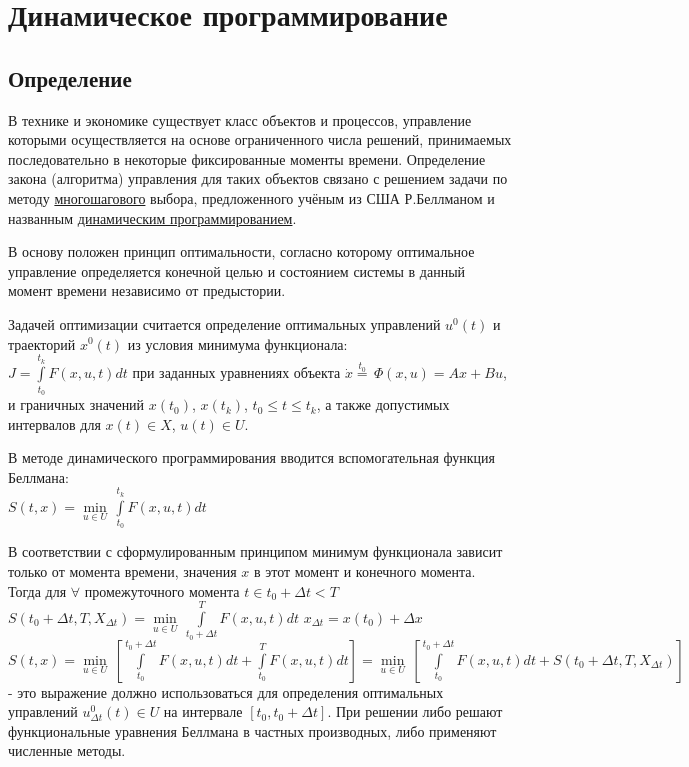\documentclass[preprint,russian,a5paper,10pt,twoside,mediummath]{ncc}
\begin{document}
\clearpage   
\section{Динамическое программирование\label{dyn_prog}}
	\subsection{Определение\label{dyn_prog:def}}
  \par В технике и экономике существует класс объектов и процессов, управление которыми осуществляется на основе ограниченного числа решений, принимаемых последовательно в некоторые фиксированные моменты времени. Определение закона (алгоритма) управления для таких объектов связано с решением задачи по методу \underline{многошагового} выбора, предложенного учёным из США Р.Беллманом и названным \underline{динамическим программированием}.
  \par В основу положен принцип оптимальности, согласно которому оптимальное управление определяется конечной целью и состоянием системы в данный момент времени независимо от предыстории.
  \par Задачей оптимизации считается определение оптимальных управлений ${{u}^{0}}\left( t \right)$ и траекторий ${{x}^{0}}\left( t \right)$ из условия минимума функционала:
\\$J=\int\limits_{{{t}_{0}}}^{{{t}_{k}}}{F\left( x,u,t \right)dt}$ при заданных уравнениях объекта $\dot{x}\overset{{{t}_{0}}}{\mathop{=}}\,\Phi \left( x,u \right)=Ax+Bu$, и граничных значений $x\left( {{t}_{0}} \right)$, $x\left( {{t}_{k}} \right)$, ${{t}_{0}}\le t\le {{t}_{k}}$, а также допустимых интервалов для $x\left( t \right)\in X$, $u\left( t \right)\in U$.
\par В методе динамического программирования вводится вспомогательная функция Беллмана:
\\$S\left( t,x \right)=\underset{u\in U}{\mathop{\min }}\,\int\limits_{{{t}_{0}}}^{{{t}_{k}}}{F\left( x,u,t \right)dt}$ 
\par В соответствии с сформулированным принципом минимум функционала зависит только от момента времени, значения $x$ в этот момент и конечного момента. Тогда для $\forall $ промежуточного момента $t\in {{t}_{0}}+\Delta t<T$ $S\left( {{t}_{0}}+\Delta t,T,{{X}_{\Delta t}} \right)=\underset{u\in U}{\mathop{\min }}\,\int\limits_{{{t}_{0}}+\Delta t}^{T}{F\left( x,u,t \right)dt}$ ${{x}_{\Delta t}}=x\left( {{t}_{0}} \right)+\Delta x$ $S\left( t,x \right)=\underset{u\in U}{\mathop{\min }}\,\left[ \int\limits_{{{t}_{0}}}^{{{t}_{0}}+\Delta t}{F\left( x,u,t \right)dt+\int\limits_{{{t}_{0}}}^{T}{F\left( x,u,t \right)dt}} \right]=\underset{u\in U}{\mathop{\min }}\,\left[ \int\limits_{{{t}_{0}}}^{{{t}_{0}}+\Delta t}{F\left( x,u,t \right)dt+S\left( {{t}_{0}}+\Delta t,T,{{X}_{\Delta t}} \right)} \right]$ - это выражение должно использоваться для определения оптимальных управлений $u_{\Delta t}^{0}\left( t \right)\in U$ на интервале $\left[ {{t}_{0}},{{t}_{0}}+\Delta t \right]$. При решении либо решают функциональные уравнения Беллмана в частных производных, либо применяют численные методы.
\end{document}
